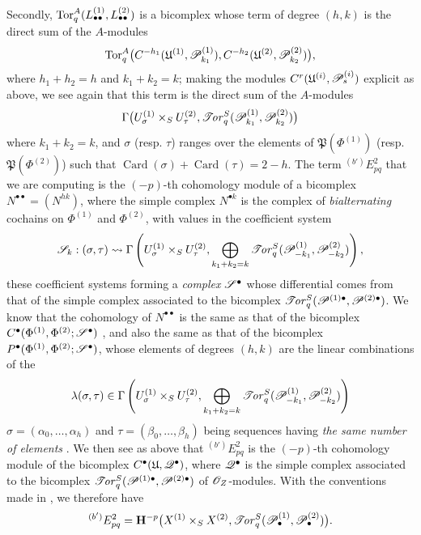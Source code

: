 \begin{env}[6.6.4]
Secondly, $\operatorname{Tor}_q^A
(L_{\bullet\bullet}^{(1)},L_{\bullet\bullet}^{(2)})$
is a bicomplex whose term of degree $(h,k)$ is the direct
sum of the $A$-modules
\[
  \operatorname{Tor}_q^A
  \bigl(
    C^{-h_1}(\mathfrak U^{(1)},\mathscr{P}_{k_1}^{(1)}),
    C^{-h_2}(\mathfrak U^{(2)},\mathscr{P}_{k_2}^{(2)})
  \bigr),
\]
where $h_1+h_2=h$ and $k_1+k_2=k$; making the modules
$C^r(\mathfrak U^{(i)},\mathscr{P}_s^{(i)})$ explicit as above, we see again
that this term is the direct sum of the $A$-modules
\[
  \Gamma\bigl(
    U_\sigma^{(1)}\times_SU_\tau^{(2)},
    \mathscr{T}\!\mathit{or}_q^S(\mathscr{P}_{k_1}^{(1)},\mathscr{P}_{k_2}^{(2)})
  \bigr)
\]
where $k_1+k_2=k$, and $\sigma$ (resp. $\tau$) ranges over the elements of
$\mathfrak P(\Phi^{(1)})$ (resp. $\mathfrak P(\Phi^{(2)})$) such that
$\operatorname{Card}(\sigma)+\operatorname{Card}(\tau)=2-h$.  The term
${}^{(b')}E_{pq}^2$ that we are computing is the $(-p)$-th cohomology module
of a bicomplex $N^{\bullet\bullet}=(N^{hk})$, where the simple complex
$N^{\bullet k}$ is the complex of \emph{bialternating}
cochains on $\Phi^{(1)}$ and $\Phi^{(2)}$, with values in the
coefficient system
\[
  \mathscr{S}_k:(\sigma,\tau)\leadsto
  \Gamma\left(
    U_\sigma^{(1)}\times_SU_\tau^{(2)},
    \bigoplus_{k_1+k_2=k}
    \mathscr{T}\!\mathit{or}_q^S(\mathscr{P}_{-k_1}^{(1)},\mathscr{P}_{-k_2}^{(2)})
  \right),
\]
these coefficient systems forming a \emph{complex}
$\mathscr{S}^\bullet$ whose differential comes from that of
the simple complex associated to the bicomplex $\mathscr{T}\!\mathit{or}_q^S
(\mathscr{P}^{(1)\bullet},\mathscr{P}^{(2)\bullet})$.
We know that the cohomology of $N^{\bullet\bullet}$ is the same as that of
the bicomplex $C^\bullet
(\Phi^{(1)},\Phi^{(2)};\mathscr{S}^\bullet)$
, and also the same as that of the bicomplex $P^\bullet
(\Phi^{(1)},\Phi^{(2)};\mathscr{S}^\bullet)$,
whose elements of degrees $(h,k)$ are the linear combinations of the
\[
  \lambda(\sigma,\tau)\in
  \Gamma\left(
    U_\sigma^{(1)}\times_SU_\tau^{(2)},
    \bigoplus_{k_1+k_2=k}
    \mathscr{T}\!\mathit{or}_q^S(\mathscr{P}_{-k_1}^{(1)},\mathscr{P}_{-k_2}^{(2)})
  \right)
\]
$\sigma=(\alpha_0,\ldots,\alpha_h)$ and
$\tau=(\beta_0,\ldots,\beta_h)$ being sequences having \emph{the same number
of elements} .  We then see as above that
${}^{(b')}E_{pq}^2$ is the $(-p)$-th cohomology module of the
bicomplex $C^\bullet(\mathfrak U,\mathscr{Q}^\bullet)$,
where $\mathscr{Q}^\bullet$ is the simple complex associated to
the bicomplex $\mathscr{T}\!\mathit{or}_q^S
(\mathscr{P}^{(1)\bullet},\mathscr{P}^{(2)\bullet})$
of $\mathscr{O}_Z$-modules.  With the conventions made in
, we therefore have
\[
  {}^{(b')}E_{pq}^2
  =
  \mathbf{H}^{-p}
  \bigl(
    X^{(1)}\times_SX^{(2)},\mathscr{T}\!\mathit{or}_q^S
    (\mathscr{P}_\bullet^{(1)},\mathscr{P}_\bullet^{(2)})
  \bigr).
\]
\end{env}

